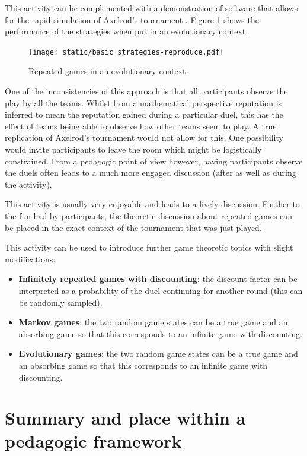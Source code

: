 \documentclass[12pt]{article}
\begin{document}
This activity can be complemented with a demonstration of software that allows
for the rapid simulation of Axelrod's tournament
\cite{Axelrod-Pythonprojectteam2015}. Figure \ref{fig:evolutionary_axelrod}
shows the performance of the strategies when put in an evolutionary context.

\begin{figure}[!hbtp]
    \centering
    \texttt{[image: static/basic\_strategies-reproduce.pdf]}
    \caption{Repeated games in an evolutionary context.}
    \label{fig:evolutionary_axelrod}
\end{figure}

One of the inconsistencies of this approach is that all participants observe the
play by all the teams. Whilst from a mathematical perspective reputation is
inferred to mean the reputation gained during a particular duel, this has the
effect of teams being able to observe how other teams seem to play. A true
replication of Axelrod's tournament would not allow for this. One possibility
would invite participants to leave the room which might be logistically
constrained. From a pedagogic point of view however, having participants observe
the duels often leads to a much more engaged discussion (after as well as during
the activity).

This activity is usually very enjoyable and leads to a lively discussion.
Further to the fun had by participants, the theoretic discussion about repeated
games can be placed in the exact context of the tournament that was just played.

This activity can be used to introduce further game theoretic topics with
slight modifications:

\begin{itemize}
    \item \textbf{Infinitely repeated games with discounting}: the discount
        factor can be interpreted as a probability of the duel continuing for
        another round (this can be randomly sampled).
    \item \textbf{Markov games}: the two random game states can be a true game
        and an absorbing game so that this corresponds to an infinite game with
        discounting.
    \item \textbf{Evolutionary games}: the two random game states can be a true game
        and an absorbing game so that this corresponds to an infinite game with
        discounting.
\end{itemize}

\section{Summary and place within a pedagogic framework}\label{sec:summary}
\end{document}
